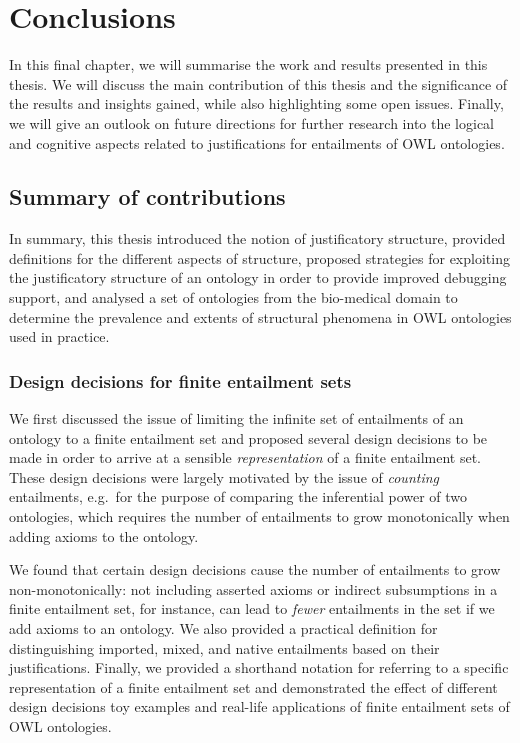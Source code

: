 \chapter{Conclusions}
\label{chap:conclusions}

In this final chapter, we will summarise the work and results presented in this thesis. We will discuss the main contribution of this thesis and the significance of the results and insights gained, while also highlighting some open issues. Finally, we will give an outlook on future directions for further research into the logical and cognitive aspects related to justifications for entailments of OWL ontologies.

\section{Summary of contributions}

In summary, this thesis introduced the notion of justificatory structure, provided definitions for the different aspects of structure, proposed strategies for exploiting the justificatory structure of an ontology in order to provide improved debugging support, and analysed a set of ontologies from the bio-medical domain to determine the prevalence and extents of structural phenomena in OWL ontologies used in practice.

\subsection{Design decisions for finite entailment sets}

We first discussed the issue of limiting the infinite set of entailments of an ontology to a finite entailment set and proposed several design decisions to be made in order to arrive at a sensible \emph{representation} of a finite entailment set. These design decisions were largely motivated by the issue of \emph{counting} entailments, e.g.\ for the purpose of comparing the inferential power of two ontologies, which requires the number of entailments to grow monotonically when adding axioms to the ontology. 

We found that certain design decisions cause the number of entailments to grow non-monotonically: not including asserted axioms or indirect subsumptions in a finite entailment set, for instance, can lead to \emph{fewer} entailments in the set if we add axioms to an ontology. We also provided a practical definition for distinguishing imported, mixed, and native entailments based on their justifications. Finally, we provided a shorthand notation for referring to a specific representation of a finite entailment set and demonstrated the effect of different design decisions toy examples and real-life applications of finite entailment sets of OWL ontologies.


